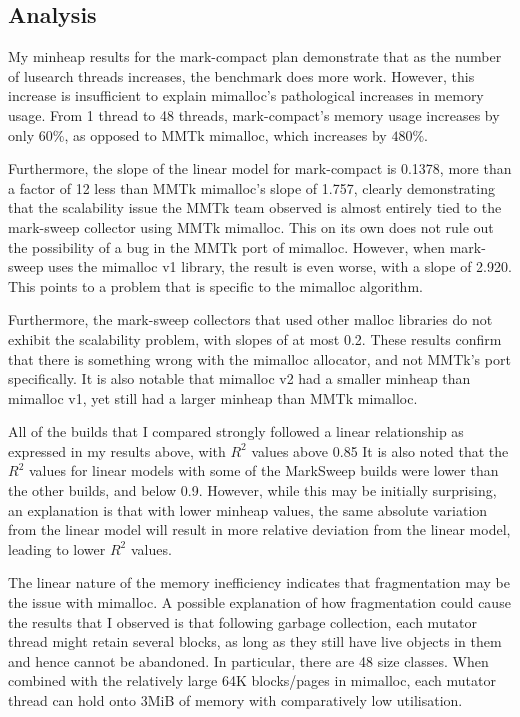 \documentclass{article}
\begin{document}
\subsection{Analysis}
My minheap results for the mark-compact plan demonstrate that as the number of lusearch threads increases, the benchmark does more work. However, this increase is insufficient to explain mimalloc's pathological increases in memory usage. From 1 thread to 48 threads, mark-compact's memory usage increases by only $60\%$, as opposed to MMTk mimalloc, which increases by $480\%$.

Furthermore, the slope of the linear model for mark-compact is 0.1378, more than a factor of 12 less than MMTk mimalloc's slope of 1.757, clearly demonstrating that the scalability issue the MMTk team observed is almost entirely tied to the mark-sweep collector using MMTk mimalloc. This on its own does not rule out the possibility of a bug in the MMTk port of mimalloc. However, when mark-sweep uses the mimalloc v1 library, the result is even worse, with a slope of 2.920. This points to a problem that is specific to the mimalloc algorithm.

Furthermore, the mark-sweep collectors that used other malloc libraries do not exhibit the scalability problem, with slopes of at most 0.2. These results confirm that there is something wrong with the mimalloc allocator, and not MMTk's port specifically. It is also notable that mimalloc v2 had a smaller minheap than mimalloc v1, yet still had a larger minheap than MMTk mimalloc.

All of the builds that I compared strongly followed a linear relationship as expressed in my results above, with $R^2$ values above 0.85 It is also noted that the $R^2$ values for linear models with some of the MarkSweep builds were lower than the other builds, and below 0.9. However, while this may be initially surprising, an explanation is that with lower minheap values, the same absolute variation from the linear model will result in more relative deviation from the linear model, leading to lower $R^2$ values.

The linear nature of the memory inefficiency indicates that fragmentation may be the issue with mimalloc. A possible explanation of how fragmentation could cause the results that I observed is that following garbage collection, each mutator thread might retain several blocks, as long as they still have live objects in them and hence cannot be abandoned. In particular, there are 48 size classes. When combined with the relatively large 64K blocks/pages in mimalloc, each mutator thread can hold onto 3MiB of memory with comparatively low utilisation.
\end{document}
